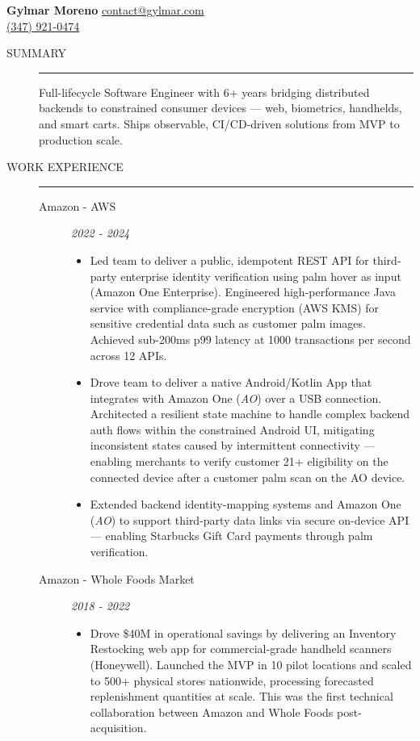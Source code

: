\documentclass[11pt]{article}
\newcommand{\sectionlabel}[1]{\textsf{\fontfamily{ptm}\selectfont #1}}
\newcommand{\resumesection}[1]{%
    \item[\sectionlabel{#1}]%
    \hfill
    \par\nobreak\nointerlineskip
    \vspace{2pt}
    \noindent\rule{\linewidth}{1.0pt}\par
    \smallskip
}
\newcommand{\jobheading}[2]{%
    \item[#1]%
    \hfill
    \textit{#2}\par
}
\begin{document}
\noindent
{\LARGE \sectionlabel{\textbf{Gylmar Moreno}}}
\hfill \begingroup\hypersetup{hidelinks}
\href{mailto:contact@gylmar.com}{\small contact@gylmar.com}\endgroup\\
\hspace*{0pt} \hfill \begingroup\hypersetup{hidelinks}
\href{tel:+13479210474}{\small (347) 921-0474}\endgroup

\begin{description}
    \resumesection{SUMMARY}
        Full-lifecycle Software Engineer with 6+ years bridging distributed
        backends to constrained consumer devices --- web, biometrics, handhelds, and
        smart carts. Ships observable, CI/CD-driven solutions from MVP to
        production scale.

    \resumesection{WORK EXPERIENCE}
        \begin{description}

        \jobheading{Amazon - AWS}{2022 - 2024}
        \begin{itemize}
            \item Led team to deliver a public, idempotent
            REST API for third-party enterprise identity verification using
            palm hover as input (Amazon One
            Enterprise). Engineered high-performance Java service with
            compliance-grade encryption (AWS KMS) for sensitive credential data
            such as customer palm images. Achieved sub-200ms p99 latency at 1000
            transactions per second across 12 APIs.

            \item Drove team to deliver a native Android/Kotlin App
            that integrates with Amazon One (\textit{AO}) over a USB connection.
            Architected a resilient state machine to handle
            complex backend auth flows within the constrained Android UI,
            mitigating inconsistent states caused by intermittent connectivity ---
            enabling merchants to verify customer 21+ eligibility on the
            connected device after a customer palm scan on the AO device.
            
            \item Extended backend identity-mapping systems and Amazon One
            (\textit{AO}) to support third-party data links via secure
            on-device API --- enabling Starbucks Gift Card payments through palm
            verification.
        \end{itemize}

        \jobheading{Amazon - Whole Foods Market}{2018 - 2022}
        \begin{itemize}
            \item Drove \$40M in operational savings by delivering an
            Inventory Restocking web app for commercial-grade handheld scanners
            (Honeywell). Launched the MVP in 10 pilot locations and scaled to
            500+ physical stores nationwide, processing forecasted replenishment
            quantities at scale. This was the first technical collaboration
            between Amazon and Whole Foods post-acquisition.


\end{itemize}
\end{description}
\end{description}
\end{document}
